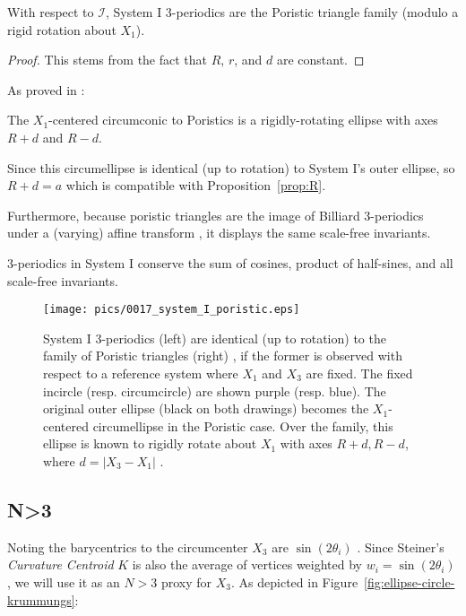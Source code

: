 \begin{proposition}
With respect to $\mathcal{I}$, System I 3-periodics are the Poristic triangle family (modulo a rigid rotation about $X_1$).
\end{proposition}

\begin{proof}
This stems from the fact that $R$, $r$, and $d$ are constant. 
\end{proof}

As proved in \cite[Thm 3]{garcia2020-poristic}:

\begin{obs}
The $X_1$-centered circumconic to Poristics is a rigidly-rotating ellipse with axes $R+d$ and $R-d$.
\end{obs}

Since this circumellipse is identical (up to rotation) to System I's outer ellipse, so $R+d=a$ which is compatible with Proposition~\ref{prop:R}.

Furthermore, because poristic triangles are the image of Billiard 3-periodics under a (varying) affine transform \cite[Thm 4]{garcia2020-poristic}, it displays the same scale-free invariants.

\begin{corollary}
3-periodics in System I conserve the sum of cosines, product of half-sines, and all scale-free invariants.
\end{corollary}

\begin{figure}
    \centering
    \texttt{[image: pics/0017\_system\_I\_poristic.eps]}
    \caption{System I 3-periodics (left) are identical (up to rotation) to the family of Poristic triangles (right) \cite{gallatly1914-geometry}, if the former is observed with respect to a reference system where $X_1$ and $X_3$ are fixed. The fixed incircle (resp. circumcircle) are shown purple (resp. blue). The original outer ellipse (black on both drawings) becomes the $X_1$-centered circumellipse in the Poristic case. Over the family, this ellipse is known to rigidly rotate about $X_1$ with axes $R+d,R-d$, where $d=|X_3-X_1|$ \cite{garcia2020-poristic}.}
    \label{fig:ellipse-circle-poristic}
\end{figure}

\subsection*{N>3}

Noting the barycentrics to the circumcenter $X_3$ are $\sin({2\theta_i})$ \cite{etc}. Since Steiner's {\em Curvature Centroid} $K$ is also the average of vertices weighted by $w_i=\sin({2\theta_i})$ \cite{steiner1838}, we will use it as an $N>3$ proxy for $X_3$. As depicted in Figure~\ref{fig:ellipse-circle-krummungs}:

